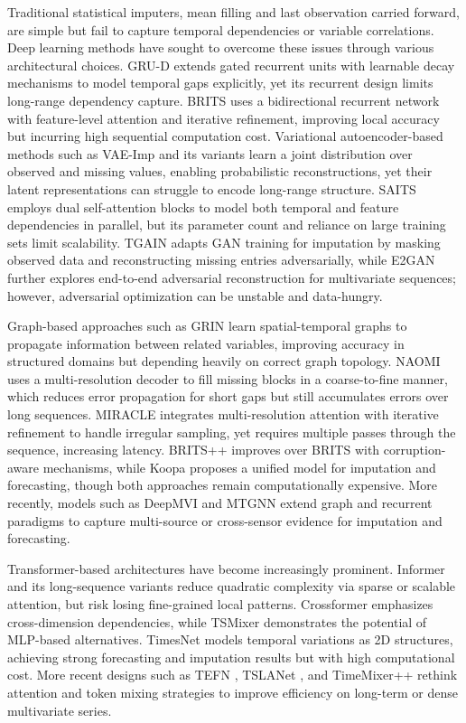 \documentclass[conference]{IEEEtran}
\begin{document}
Traditional statistical imputers, mean filling and last observation carried forward, are simple but fail to capture
temporal dependencies or variable correlations. Deep learning methods have sought to overcome these issues through
various architectural choices. GRU-D \cite{GRU_D,messou2024enhancing} extends gated recurrent units with learnable decay mechanisms to
model temporal gaps explicitly, yet its recurrent design limits long-range dependency capture. BRITS \cite{BRITS}
uses a bidirectional recurrent network with feature-level attention and iterative refinement, improving local accuracy
but incurring high sequential computation cost. Variational autoencoder-based methods such as VAE-Imp \cite{VAE_Impute}
and its variants learn a joint distribution over observed and missing values, enabling probabilistic reconstructions,
yet their latent representations can struggle to encode long-range structure. SAITS \cite{SAITS} employs dual self-attention blocks
to model both temporal and feature dependencies in parallel, but its parameter count and reliance on large training sets
limit scalability. TGAIN \cite{TGAIN} adapts GAN training for imputation by masking observed data and reconstructing
missing entries adversarially, while E2GAN \cite{E2GAN} further explores end-to-end adversarial reconstruction for multivariate sequences;
however, adversarial optimization can be unstable and data-hungry.

Graph-based approaches such as GRIN \cite{GRIN} learn spatial-temporal graphs to propagate information between
related variables, improving accuracy in structured domains but depending heavily on correct graph topology.
NAOMI uses a multi-resolution decoder to fill missing blocks in a coarse-to-fine manner, which reduces
error propagation for short gaps but still accumulates errors over long sequences. MIRACLE integrates
multi-resolution attention with iterative refinement to handle irregular sampling, yet requires multiple passes through
the sequence, increasing latency. BRITS++ improves over BRITS with corruption-aware mechanisms,
while Koopa proposes a unified model for imputation and forecasting, though both approaches remain
computationally expensive. More recently, models such as DeepMVI and MTGNN extend graph
and recurrent paradigms to capture multi-source or cross-sensor evidence for imputation and forecasting.

Transformer-based architectures have become increasingly prominent. Informer and its long-sequence variants
\cite{messou2025tsformer,Reformer,LongNet} reduce quadratic complexity via sparse or scalable attention, but risk losing fine-grained local patterns.
Crossformer \cite{Crossformer} emphasizes cross-dimension dependencies, while TSMixer \cite{TSMixer} demonstrates the
potential of MLP-based alternatives. TimesNet \cite{TimesNetImpute} models temporal variations as 2D structures,
achieving strong forecasting and imputation results but with high computational cost. More recent designs such as TEFN
\cite{TEFN}, TSLANet \cite{Tslanet}, and TimeMixer++ \cite{Timemixerpp} rethink attention and token mixing strategies
to improve efficiency on long-term or dense multivariate series.
\end{document}
